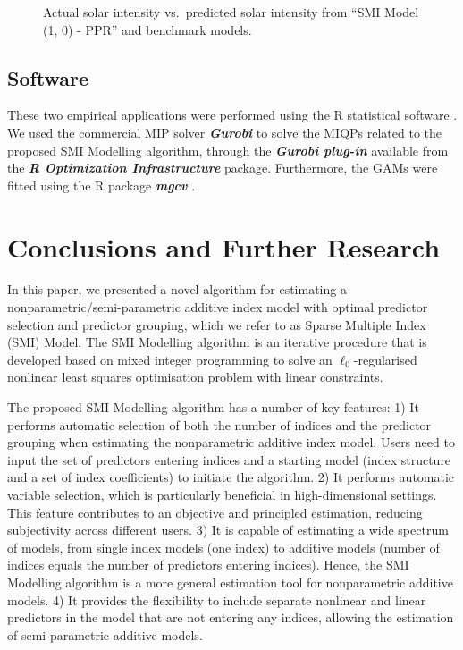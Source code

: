 \documentclass[
  11pt,
  a4paper,
]{article}
\begin{document}
\begin{figure}


\caption{\label{fig-solarPred}Actual solar intensity vs.~predicted solar
intensity from ``SMI Model (1, 0) - PPR'' and benchmark models.}

\end{figure}%

\subsection{Software}\label{software}

These two empirical applications were performed using the R statistical
software \autocite{Rcore}. We used the commercial MIP solver
\textbf{\emph{Gurobi}} \autocite{gurobi2023} to solve the MIQPs related
to the proposed SMI Modelling algorithm, through the
\textbf{\emph{Gurobi plug-in}}
\autocite[ROI.plugin.gurobi,][]{Schwendinger2023} available from the
\textbf{\emph{R Optimization Infrastructure}}
\autocites[ROI,][]{Hornik2023,Theusl2020} package. Furthermore, the GAMs
were fitted using the R package \textbf{\emph{mgcv}}
\autocite{mgcv,Wood2011}.

\section{Conclusions and Further Research}\label{sec-conclusion}

In this paper, we presented a novel algorithm for estimating a
nonparametric/semi-parametric additive index model with optimal
predictor selection and predictor grouping, which we refer to as Sparse
Multiple Index (SMI) Model. The SMI Modelling algorithm is an iterative
procedure that is developed based on mixed integer programming to solve
an \(\ell_{0}\)-regularised nonlinear least squares optimisation problem
with linear constraints.

The proposed SMI Modelling algorithm has a number of key features: 1) It
performs automatic selection of both the number of indices and the
predictor grouping when estimating the nonparametric additive index
model. Users need to input the set of predictors entering indices and a
starting model (index structure and a set of index coefficients) to
initiate the algorithm. 2) It performs automatic variable selection,
which is particularly beneficial in high-dimensional settings. This
feature contributes to an objective and principled estimation, reducing
subjectivity across different users. 3) It is capable of estimating a
wide spectrum of models, from single index models (one index) to
additive models (number of indices equals the number of predictors
entering indices). Hence, the SMI Modelling algorithm is a more general
estimation tool for nonparametric additive models. 4) It provides the
flexibility to include separate nonlinear and linear predictors in the
model that are not entering any indices, allowing the estimation of
semi-parametric additive models.
\end{document}

